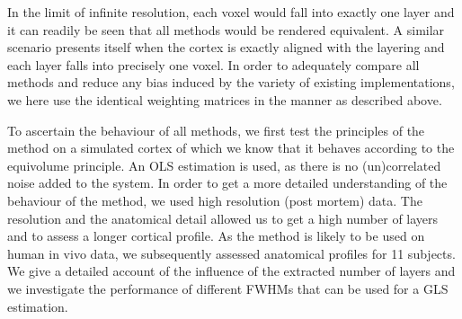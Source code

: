 In the limit of infinite resolution, each voxel would fall into exactly one layer and it can readily be seen that all methods would be rendered equivalent. A similar scenario presents itself when the cortex is exactly aligned with the layering and each layer falls into precisely one voxel. In order to adequately compare all methods and reduce any bias induced by the variety of existing implementations, we here use the identical weighting matrices in the manner as described above. 

To ascertain the behaviour of all methods, we first test the principles of the method on a simulated cortex of which we know that it behaves according to the equivolume principle. An OLS estimation is used, as there is no (un)correlated noise added to the system. In order to get a more detailed understanding of the behaviour of the method, we used high resolution (post mortem) data. The resolution and the anatomical detail allowed us to get a high number of layers and to assess a longer cortical profile. As the method is likely to be used on human in vivo data, we subsequently assessed anatomical profiles for 11 subjects. We give a detailed account of the influence of the extracted number of layers and we investigate the performance of different FWHMs that can be used for a GLS estimation.